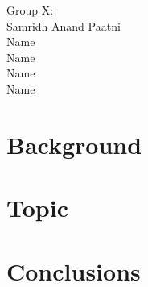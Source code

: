 \documentclass[14pt]{extarticle}
\begin{document}
\begin{flushright}
    Group X:\\
    Samridh Anand Paatni\\
    Name \\
    Name \\
    Name \\
    Name \\
\end{flushright}

\newpage
\tableofcontents
\newpage
\newpage

\section{Background}

\section{Topic}

\section{Conclusions}
\end{document}

